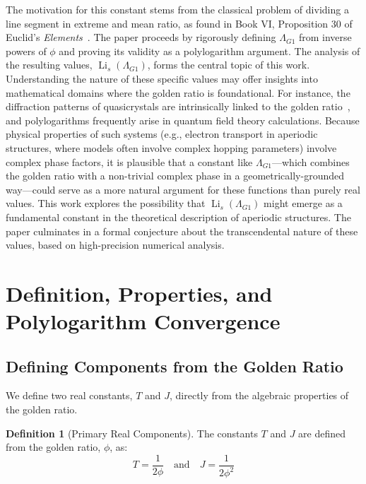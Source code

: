 \documentclass{amsart}
\theoremstyle{plain}
\theoremstyle{definition}
\newtheorem{definition}[theorem]{Definition}
\theoremstyle{remark}
\DeclareMathOperator{\Li}{Li}
\newcommand{\LambdaG}{\Lambda_{G1}}
\newcommand{\phiG}{\phi}
\begin{document}
The motivation for this constant stems from the classical problem of dividing a line segment in extreme and mean ratio, as found in Book VI, Proposition 30 of Euclid's \textit{Elements}~\cite{Euclid}. The paper proceeds by rigorously defining $\LambdaG$ from inverse powers of $\phiG$ and proving its validity as a polylogarithm argument. The analysis of the resulting values, $\Li_s(\LambdaG)$, forms the central topic of this work. Understanding the nature of these specific values may offer insights into mathematical domains where the golden ratio is foundational. For instance, the diffraction patterns of quasicrystals are intrinsically linked to the golden ratio~\cite{Levine1984}, and polylogarithms frequently arise in quantum field theory calculations. Because physical properties of such systems (e.g., electron transport in aperiodic structures, where models often involve complex hopping parameters) involve complex phase factors, it is plausible that a constant like $\LambdaG$—which combines the golden ratio with a non-trivial complex phase in a geometrically-grounded way—could serve as a more natural argument for these functions than purely real values. This work explores the possibility that $\Li_s(\LambdaG)$ might emerge as a fundamental constant in the theoretical description of aperiodic structures. The paper culminates in a formal conjecture about the transcendental nature of these values, based on high-precision numerical analysis.

\section{Definition, Properties, and Polylogarithm Convergence}

\subsection{Defining Components from the Golden Ratio}
We define two real constants, $T$ and $J$, directly from the algebraic properties of the golden ratio.
\begin{definition}[Primary Real Components]
The constants $T$ and $J$ are defined from the golden ratio, $\phiG$, as:
\[ T = \frac{1}{2\phiG} \quad \text{and} \quad J = \frac{1}{2\phiG^2} \]
\end{definition}
\end{document}
